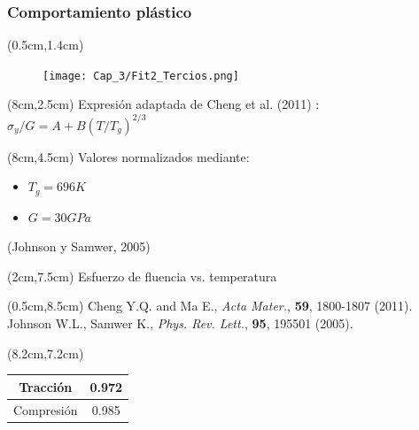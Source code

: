 \begin{frame}
 \frametitle{Comportamiento pl\'astico}
 \begin{textblock*}{7cm}(0.5cm,1.4cm)
  \begin{figure}[htp]
      \centering
      \texttt{[image: Cap\_3/Fit2\_Tercios.png]}
  \end{figure}
 \end{textblock*}
 \begin{textblock*}{4.5cm}(8cm,2.5cm)
      Expresi\'on adaptada de Cheng et al. (2011) :\\
	$\sigma_y/G =A+B(T/T_g)^{2/3}$
  \end{textblock*}
  \begin{textblock*}{4.5cm}(8cm,4.5cm)
      Valores normalizados mediante:
      \begin{itemize}
       \item $T_g=696K$
       \item $G=30GPa$
      \end{itemize}
      \footnotesize{(Johnson y Samwer, 2005)}
  \end{textblock*}
  \begin{textblock*}{5cm}(2cm,7.5cm)
    \scriptsize{Esfuerzo de fluencia vs. temperatura}
  \end{textblock*}
  \begin{textblock*}{12cm}(0.5cm,8.5cm) %
    \scriptsize{Cheng Y.Q. and Ma E., \textit{Acta Mater.}, \textbf{59}, 1800-1807 (2011).\\
    Johnson W.L., Samwer K., \textit{Phys. Rev. Lett.}, \textbf{95}, 195501 (2005).}
  \end{textblock*}
  \begin{textblock*}{5cm}(8.2cm,7.2cm)
    \begin{table}[htp]
    \begin{center}
    \begin{tabular}{c c}
    \hline
    \scriptsize{Tracci\'on} & \scriptsize{0.972} \\ \hline
    \scriptsize{Compresión} & \scriptsize{0.985} \\ \hline
    \end{tabular}
    \end{center}
    \end{table}
  \end{textblock*}
\end{frame}


